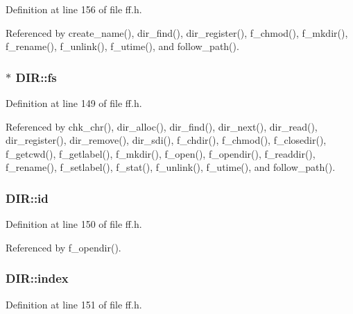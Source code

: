 Definition at line 156 of file ff.\+h.



Referenced by create\+\_\+name(), dir\+\_\+find(), dir\+\_\+register(), f\+\_\+chmod(), f\+\_\+mkdir(), f\+\_\+rename(), f\+\_\+unlink(), f\+\_\+utime(), and follow\+\_\+path().

\subsubsection[{\texorpdfstring{fs}{fs}}]{$\ast$ D\+I\+R\+::fs}\hypertarget{structDIR_a312eaa66cb703fb2993ea98173dc0c9a}{}\label{structDIR_a312eaa66cb703fb2993ea98173dc0c9a}


Definition at line 149 of file ff.\+h.



Referenced by chk\+\_\+chr(), dir\+\_\+alloc(), dir\+\_\+find(), dir\+\_\+next(), dir\+\_\+read(), dir\+\_\+register(), dir\+\_\+remove(), dir\+\_\+sdi(), f\+\_\+chdir(), f\+\_\+chmod(), f\+\_\+closedir(), f\+\_\+getcwd(), f\+\_\+getlabel(), f\+\_\+mkdir(), f\+\_\+open(), f\+\_\+opendir(), f\+\_\+readdir(), f\+\_\+rename(), f\+\_\+setlabel(), f\+\_\+stat(), f\+\_\+unlink(), f\+\_\+utime(), and follow\+\_\+path().

\subsubsection[{\texorpdfstring{id}{id}}]{ D\+I\+R\+::id}\hypertarget{structDIR_aca2c95a99a04173917ec70c030891383}{}\label{structDIR_aca2c95a99a04173917ec70c030891383}


Definition at line 150 of file ff.\+h.



Referenced by f\+\_\+opendir().

\subsubsection[{\texorpdfstring{index}{index}}]{ D\+I\+R\+::index}\hypertarget{structDIR_ab95119fbacbe45e3e9ee0f962b844092}{}\label{structDIR_ab95119fbacbe45e3e9ee0f962b844092}


Definition at line 151 of file ff.\+h.



